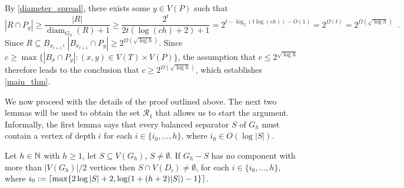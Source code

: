 \documentclass{patmorin}
\DeclareMathOperator{\diam}{diam}
\renewcommand{\le}{\leqslant}
\renewcommand{\ge}{\geqslant}
\renewcommand{\geq}{\geqslant}
\begin{document}
%
By \cref{diameter_spread}, there exists some $y \in V(P)$ such that
\[
  |R\cap P_y| \ge \frac{|R|}{\diam_{G_h}(R)+1} \ge \frac{2^t}{2t(\log(ch)+2)+1}
  = 2^{t-\log_2(t\log(ch))-O(1)} =  2^{\Omega(t)} = 2^{\Omega(\sqrt{\log h})} \enspace .
\]
Since $R\subseteq B_{x_{t+1}}$, $|B_{x_{t+1}}\cap P_y|\ge 2^{\Omega(\sqrt{\log h})}$. Since $c\ge \max\{|B_x\cap P_y|:(x,y)\in V(T)\times V(P)\}$, the assumption that $c\le 2^{\sqrt{\log h}}$ therefore leads to the conclusion that $c\ge 2^{\Omega(\sqrt{\log h})}$, which establishes \cref{main_thm}.

We now proceed with the details of the proof outlined above.  The next two lemmas will be used to obtain the set $\mathcal{R}_1$ that allows us to start the argument.  Informally, the first lemma says that every balanced separator $S$ of $G_h$ must contain a vertex of depth $i$ for each $i\in\{i_0,\ldots,h\}$, where $i_0\in O(\log|S|)$.

\begin{lem}\label{small_depth_separator}
  Let $h\in\mathbb{N}$ with $h\geq 1$, let $S\subseteq V(G_h)$, $S\neq\emptyset$.  If $G_h-S$ has no component with more than $|V(G_h)|/2$ vertices then $S\cap V(D_i)\neq\emptyset$, for each $i\in\{i_0,\ldots,h\}$, where $i_0:={\lceil \max\{2\log|S|+2, \log(1+(h+2)|S|)-1\} \rceil}$.
\end{lem}
\end{document}
